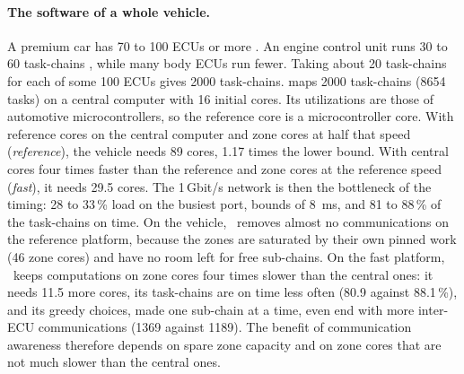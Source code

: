 \paragraph{The software of a whole vehicle.} A premium car has 70 to 100
ECUs or more \cite{charette2009car}. An engine control unit runs 30 to 60
task-chains \cite{kramer2015waters}, while many body ECUs run fewer. Taking
about 20 task-chains for each of some 100 ECUs gives 2000 task-chains.
 maps 2000 task-chains (8654 tasks) on a central computer
with 16 initial cores. Its utilizations are those of automotive
microcontrollers, so the reference core is a microcontroller core. With
reference cores on the central computer and zone cores at half that speed
(\emph{reference}), the vehicle needs 89 cores, 1.17 times the lower
bound. With central cores four times faster than the reference and zone
cores at the reference speed (\emph{fast}), it needs 29.5 cores. The 1\,Gbit/s network is
then the bottleneck of the timing: 28 to 33\,\% load on the busiest port,
bounds of \SI{8}{ms}, and 81 to 88\,\% of the task-chains on time. On the
vehicle, \CADU\ removes almost no communications on the reference platform,
because the zones are saturated by their own pinned work (46 zone cores)
and have no room left for free sub-chains. On the fast platform, \CADU\
keeps computations on zone cores four times slower than the central ones:
it needs 11.5 more cores, its task-chains are on time less often (80.9
against 88.1\,\%), and its greedy choices, made one sub-chain at a time,
even end with more inter-ECU communications (1369 against 1189). The
benefit of communication awareness therefore depends on spare zone
capacity and on zone cores that are not much slower than the central
ones.

